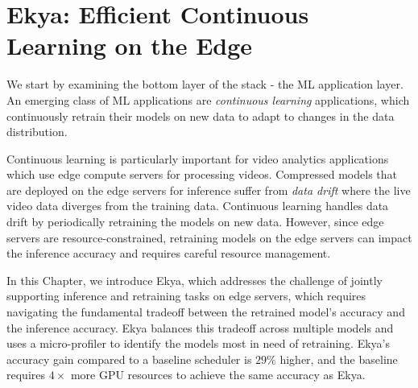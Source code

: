 \newcommand{\eg}{{\it e.g.,}\xspace}
\newcommand{\ie}{{\it i.e.,}\xspace}
\newcommand{\tbd}[1]{{\bf [[TBD: {#1}]]}}
\newcommand{\eat}[1]{}
\newcommand{\xref}[1]{\S\ref{#1}}
\newcommand{\name}{{Ekya}\xspace}
\newcommand{\fair}{uniform\xspace}
\newcommand{\Fair}{Uniform\xspace}
\newcommand{\myparashort}[1]{\vspace{0.07cm}\noindent{\bf {#1}}~}
\newcommand{\mypara}[1]{\vspace{0.07cm}\noindent{\bf {#1}:}~}
\newcommand{\myparaq}[1]{\vspace{0.07cm}\noindent{\bf {#1}?}~}

\chapter{Ekya: Efficient Continuous Learning on the Edge}
\label{ch_ekya}

We start by examining the bottom layer of the stack - the ML application layer. An emerging class of ML applications are {\em continuous learning} applications, which continuously retrain their models on new data to adapt to changes in the data distribution. 

Continuous learning is particularly important for video analytics applications which use edge compute servers for processing videos. 
Compressed models that are deployed on the edge servers for inference suffer from {\em data drift} where the live video data diverges from the training data. Continuous learning handles data drift by periodically retraining the models on new data. However, since edge servers are resource-constrained, retraining models on the edge servers can impact the inference accuracy and requires careful resource management.

In this Chapter, we introduce \name, which addresses the challenge of jointly supporting inference and retraining tasks on edge servers, which requires navigating the fundamental tradeoff between the retrained model's accuracy and the inference accuracy. 
\name balances this tradeoff across multiple models and uses a micro-profiler to identify the models most in need of retraining. {\name}'s accuracy gain compared to a baseline scheduler is $29\%$ higher, and the baseline requires $4\times$ more GPU resources to achieve the same accuracy as \name.











%
%
%
% 


%
% 
